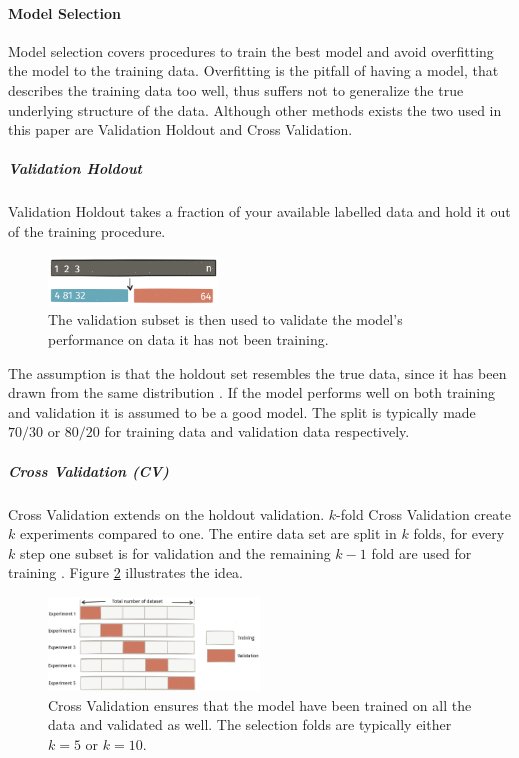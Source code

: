 \paragraph{Model Selection}

Model selection covers procedures to train the best model and avoid overfitting the model to the training data. Overfitting is the pitfall of having a model, that describes the training data too well, thus suffers not to generalize the true underlying structure of the data. Although other methods exists the two used in this paper are Validation Holdout and Cross Validation. 

\subparagraph{Validation Holdout}

Validation Holdout takes a fraction of your available labelled data and hold it out of the training procedure. 

\begin{figure}[H]
    \centering
    \includegraphics[width=0.4\textwidth]{figures/validationset.png}
    \caption[]{The validation subset is then used to validate the model's performance on data it has not been training.}
    \label{fig:val_holdout}
\end{figure}

The assumption is that the holdout set resembles the true data, since it has been drawn from the same distribution \cite{Goodfellow-et-al-2016}. If the model performs well on both training and validation it is assumed to be a good model. The split is typically made $70/30$ or $80/20$ for training data and validation data respectively. 

\subparagraph{Cross Validation (CV)}

Cross Validation extends on the holdout validation. $k$-fold Cross Validation create $k$ experiments compared to one. The entire data set are split in $k$ folds, for every $k$ step one subset is for validation and the remaining $k-1$ fold are used for training \cite{Goodfellow-et-al-2016}. Figure \ref{fig:cv} illustrates the idea. 

\begin{figure}[H]
    \centering
    \includegraphics[width=0.5\textwidth]{figures/cv.png}
    \caption[]{Cross Validation ensures that the model have been trained on all the data and validated as well. The selection folds are typically either $k=5$ or $k=10$. }
    \label{fig:cv}
\end{figure}

